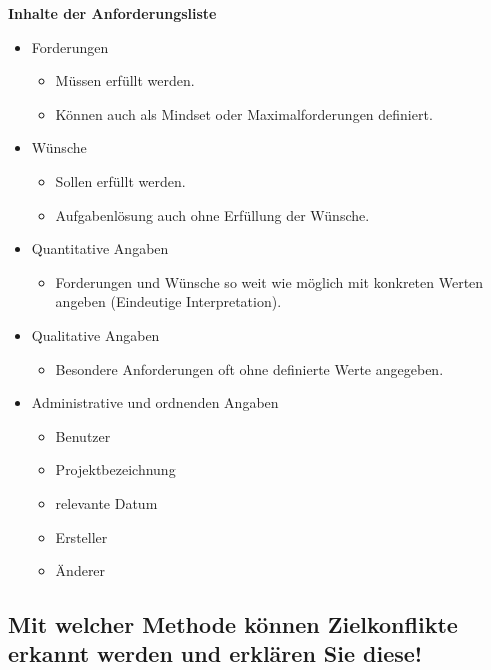 \textbf{Inhalte der Anforderungsliste}
\begin{itemize}
    \item Forderungen
        \begin{itemize}
            \item Müssen erfüllt werden.
            \item Können auch als Mindset oder Maximalforderungen definiert.
        \end{itemize}
    \item Wünsche
        \begin{itemize}
            \item Sollen erfüllt werden.
            \item Aufgabenlösung auch ohne Erfüllung der Wünsche.
        \end{itemize}
    \item Quantitative Angaben
        \begin{itemize}
            \item Forderungen und Wünsche so weit wie möglich mit konkreten Werten angeben (Eindeutige Interpretation).
        \end{itemize}
    \item Qualitative Angaben
        \begin{itemize}
            \item Besondere Anforderungen oft ohne definierte Werte angegeben.
        \end{itemize}
    \item Administrative und ordnenden Angaben
        \begin{itemize}
            \item Benutzer
            \item Projektbezeichnung
            \item relevante Datum
            \item Ersteller
            \item Änderer
        \end{itemize}
\end{itemize}

\subsection{Mit welcher Methode können Zielkonflikte erkannt werden und erklären Sie diese! }



